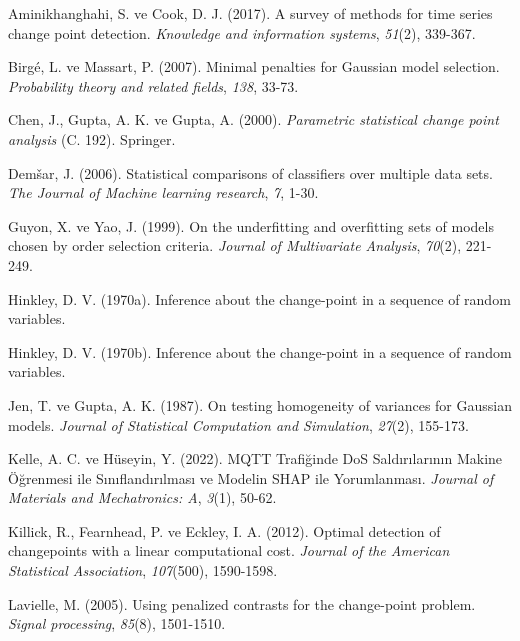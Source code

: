 \documentclass[12pt,twoside]{deuthesis}
\begin{document}
\label{refs}
\begin{CSLReferences}{1}{0}
Aminikhanghahi, S. ve Cook, D. J. (2017). A survey of methods for time series change point detection. \emph{Knowledge and information systems}, \emph{51}(2), 339-367.

Birgé, L. ve Massart, P. (2007). Minimal penalties for Gaussian model selection. \emph{Probability theory and related fields}, \emph{138}, 33-73.

Chen, J., Gupta, A. K. ve Gupta, A. (2000). \emph{Parametric statistical change point analysis} (C. 192). Springer.

Demšar, J. (2006). Statistical comparisons of classifiers over multiple data sets. \emph{The Journal of Machine learning research}, \emph{7}, 1-30.

Guyon, X. ve Yao, J. (1999). On the underfitting and overfitting sets of models chosen by order selection criteria. \emph{Journal of Multivariate Analysis}, \emph{70}(2), 221-249.

Hinkley, D. V. (1970a). Inference about the change-point in a sequence of random variables.

Hinkley, D. V. (1970b). Inference about the change-point in a sequence of random variables.

Jen, T. ve Gupta, A. K. (1987). On testing homogeneity of variances for Gaussian models. \emph{Journal of Statistical Computation and Simulation}, \emph{27}(2), 155-173.

Kelle, A. C. ve Hüseyin, Y. (2022). MQTT Trafi{ğ}inde DoS Sald{ı}r{ı}lar{ı}n{ı}n Makine {Ö}{ğ}renmesi ile S{ı}n{ı}fland{ı}r{ı}lmas{ı} ve Modelin SHAP ile Yorumlanmas{ı}. \emph{Journal of Materials and Mechatronics: A}, \emph{3}(1), 50-62.

Killick, R., Fearnhead, P. ve Eckley, I. A. (2012). Optimal detection of changepoints with a linear computational cost. \emph{Journal of the American Statistical Association}, \emph{107}(500), 1590-1598.

Lavielle, M. (2005). Using penalized contrasts for the change-point problem. \emph{Signal processing}, \emph{85}(8), 1501-1510.


\end{CSLReferences}
\end{document}
